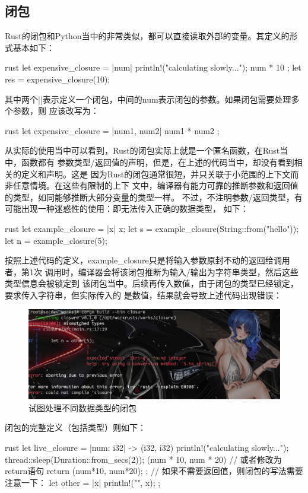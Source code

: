 \subsection{闭包}
Rust的闭包和Python当中的非常类似，都可以直接读取外部的变量。其定义的形式基本如下：
\begin{code-block}{rust}
let expensive_closure = |num| {
    println!("calculating slowly...");
    num * 10
};
let res = expensive_closure(10);
\end{code-block}
其中两个||表示定义一个闭包，中间的num表示闭包的参数。如果闭包需要处理多个参数，则
应该改写为：
\begin{code-block}{rust}
let expensive_closure = |num1, num2| { num1 * num2 };
\end{code-block}

从实际的使用当中可以看到，Rust的闭包实际上就是一个匿名函数，在Rust当中，函数都有
参数类型/返回值的声明，但是，在上述的代码当中，却没有看到相关的定义和声明。这是
因为Rust的闭包通常很短，并只关联于小范围的上下文而非任意情境。在这些有限制的上下
文中，编译器有能力可靠的推断参数和返回值的类型，如同能够推断大部分变量的类型一样。
不过，不注明参数/返回类型，有可能出现一种迷惑性的使用：即无法传入正确的数据类型，
如下：
\begin{code-block}{rust}
let example_closure = |x| x;
let s = example_closure(String::from("hello"));
let n = example_closure(5);
\end{code-block}
按照上述代码的定义，example\_closure只是将输入参数原封不动的返回给调用者，第1次
调用时，编译器会将该闭包推断为输入/输出为字符串类型，然后这些类型信息会被锁定到
该闭包当中。后续再传入数值，由于闭包的类型已经锁定，要求传入字符串，但实际传入的
是数值，结果就会导致上述代码出现错误：
\begin{figure}[H]
  \centering
  \includegraphics[width=\linewidth]{rust_closure_diffrent_type.png}
  \caption{试图处理不同数据类型的闭包}
  \label{fig:rust_closure_diffrent}
\end{figure}

闭包的完整定义（包括类型）则如下：
\begin{code-block}{rust}
let live_closure = |num: i32| -> (i32, i32) {
    println!("calculating slowly...");
    thread::sleep(Duration::from_secs(2));
    (num * 10, num * 20) // 或者修改为return语句 return (num*10, num*20);
};
// 如果不需要返回值，则闭包的写法需要注意一下：
let other = |x| { println!("{}", x); };
\end{code-block}

